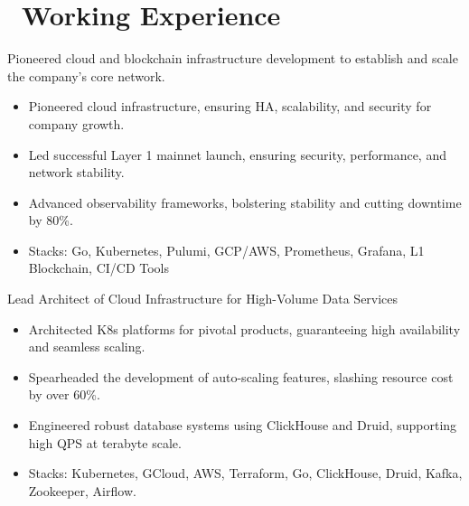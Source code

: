 \documentclass{resume}
\begin{document}
\section{\faUsers\ Working Experience}
Pioneered cloud and blockchain infrastructure development to establish and scale the company's core network.
\begin{itemize}
  \item Pioneered cloud infrastructure, ensuring HA, scalability, and security for company growth.
  \item Led successful Layer 1 mainnet launch, ensuring security, performance, and network stability.
  \item Advanced observability frameworks, bolstering stability and cutting downtime by 80\%.
  \item Stacks: Go, Kubernetes, Pulumi, GCP/AWS, Prometheus, Grafana, L1 Blockchain, CI/CD Tools
\end{itemize}

Lead Architect of Cloud Infrastructure for High-Volume Data Services
\begin{itemize}
  \item Architected K8s platforms for pivotal products, guaranteeing high availability and seamless scaling.
  \item Spearheaded the development of auto-scaling features, slashing resource cost by over 60\%.
  \item Engineered robust database systems using ClickHouse and Druid, supporting high QPS at terabyte scale.
  \item Stacks: Kubernetes, GCloud, AWS, Terraform, Go, ClickHouse, Druid, Kafka, Zookeeper, Airflow.
\end{itemize}
\end{document}
